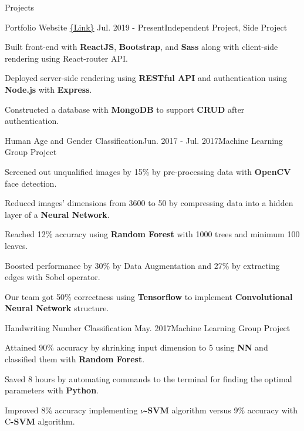 \documentclass{resume} %
\begin{document}
\begin{rSection}{Projects}

\begin{rSubsection}{Portfolio Website \scriptsize{\href{https://shang-yun-portfolio-website.herokuapp.com/}{\{Link\}}} }{Jul. 2019 - Present}{Independent Project, Side Project}{}
\item Built front-end with \textbf{ReactJS}, \textbf{Bootstrap}, and \textbf{Sass} along with client-side rendering using React-router API.
\item Deployed server-side rendering using \textbf{RESTful API} and authentication using \textbf{Node.js} with \textbf{Express}.
\item Constructed a database with \textbf{MongoDB} to support \textbf{CRUD} after authentication.
\end{rSubsection}

\begin{rSubsection}{Human Age and Gender Classification}{Jun. 2017 - Jul. 2017}{Machine Learning Group Project}{}
\item Screened out unqualified images by 15\% by pre-processing data with \textbf{OpenCV} face detection. 
\item Reduced images’ dimensions from 3600 to 50 by compressing data into a hidden layer of a \textbf{Neural Network}.
\item Reached 12\% accuracy using \textbf{Random Forest} with 1000 trees and minimum 100 leaves.
\item Boosted performance by 30\% by Data Augmentation and 27\% by extracting edges with Sobel operator.
\item Our team got 50\% correctness using \textbf{Tensorflow} to implement \textbf{Convolutional Neural Network} structure.
\end{rSubsection}
 
\begin{rSubsection}{Handwriting Number Classification}{ May. 2017}{Machine Learning Group Project}{}
\item Attained 90\% accuracy by shrinking input dimension to 5 using \textbf{NN} and classified them with \textbf{Random Forest}. 
\item Saved 8 hours by automating commands to the terminal for finding the optimal parameters with \textbf{Python}.
\item Improved 8\% accuracy implementing \textbf{$\nu$-SVM} algorithm versus 9\% accuracy with C\textbf{-SVM} algorithm.

\end{rSubsection}
 
\end{rSection}
\end{document}
